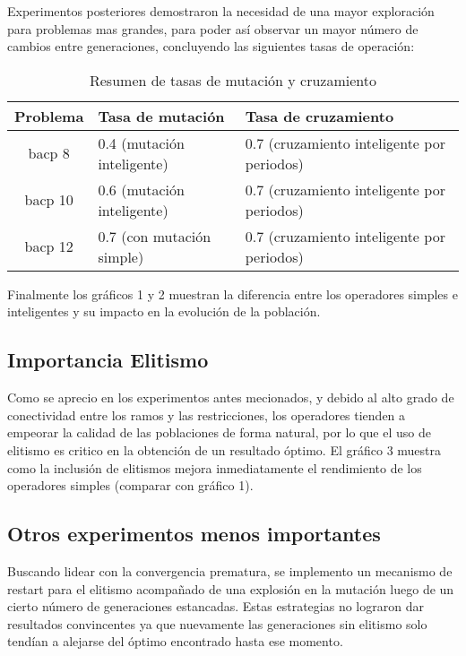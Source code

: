\documentclass[letter, 10pt]{article}
\begin{document}
Experimentos posteriores demostraron la necesidad de una mayor exploración para
problemas mas grandes, para poder así observar un mayor número de cambios entre
generaciones, concluyendo las siguientes tasas de operación:

\begin{table}[h]
\label{table:tasas}
\caption{Resumen de tasas de mutación y cruzamiento}
\begin{tabular}{|c|l|l|}
\hline 
Problema & Tasa de mutación  & Tasa de cruzamiento \tabularnewline
\hline 
\hline 
bacp 8 & 0.4 (mutación inteligente) & 0.7 (cruzamiento inteligente por periodos) \tabularnewline
\hline 
bacp 10 & 0.6 (mutación inteligente) & 0.7 (cruzamiento inteligente por periodos) \tabularnewline
\hline 
bacp 12 & 0.7 (con mutación simple) & 0.7 (cruzamiento inteligente por periodos) \tabularnewline
\hline 
\end{tabular}
\end{table}

Finalmente los gráficos 1 y 2 muestran la diferencia entre los operadores
simples e inteligentes y su impacto en la evolución de la población.

\begin{center}

\end{center}



\begin{center}

\end{center}



\subsection{Importancia Elitismo}
Como se aprecio en los experimentos antes mecionados, y debido al alto grado de
conectividad entre los ramos y las restricciones, los operadores tienden a
empeorar la calidad de las poblaciones de forma natural, por lo que el uso de
elitismo es critico en la obtención de un resultado óptimo. El gráfico 3 muestra
como la inclusión de elitismos mejora inmediatamente el rendimiento de los
operadores simples (comparar con gráfico 1).


\begin{center}
  
\end{center}


\subsection{Otros experimentos menos importantes}
Buscando lidear con la convergencia prematura, se implemento un mecanismo de
restart para el elitismo acompañado de una explosión en la  mutación luego de un cierto
número de generaciones estancadas. Estas estrategias no lograron dar resultados
convincentes ya que nuevamente las generaciones sin elitismo solo tendían a
alejarse del óptimo encontrado hasta ese momento.
\end{document}
